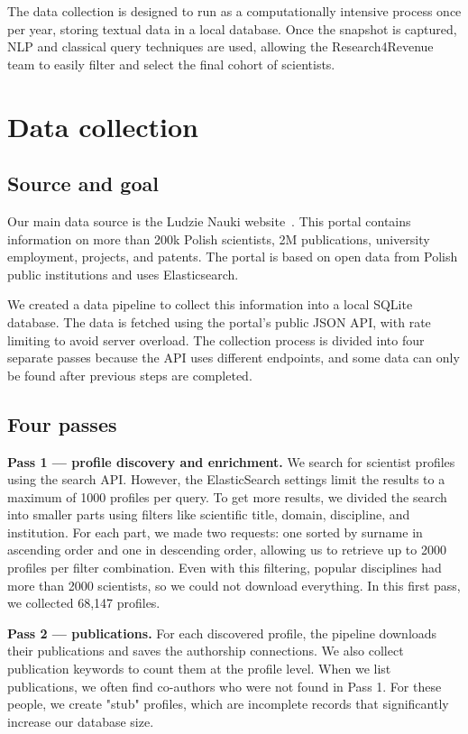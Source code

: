 \documentclass{article}
\begin{document}
The data collection is designed to run as a computationally intensive process once per year, storing textual data in a local database. Once the snapshot is captured, NLP and classical query techniques are used, allowing the Research4Revenue team to easily filter and select the final cohort of scientists.

\section{Data collection}

\subsection{Source and goal}
Our main data source is the Ludzie Nauki website~\cite{ludzie-nauki}. This portal contains information on more than 200k Polish scientists, 2M publications, university employment, projects, and patents. The portal is based on open data from Polish public institutions and uses Elasticsearch. 

We created a data pipeline to collect this information into a local SQLite database. The data is fetched using the portal's public JSON API, with rate limiting to avoid server overload. The collection process is divided into four separate passes because the API uses different endpoints, and some data can only be found after previous steps are completed.

\subsection{Four passes}
\textbf{Pass 1 --- profile discovery and enrichment.}
We search for scientist profiles using the search API. However, the ElasticSearch settings limit the results to a maximum of 1000 profiles per query. To get more results, we divided the search into smaller parts using filters like scientific title, domain, discipline, and institution. For each part, we made two requests: one sorted by surname in ascending order and one in descending order, allowing us to retrieve up to 2000 profiles per filter combination. Even with this filtering, popular disciplines had more than 2000 scientists, so we could not download everything. In this first pass, we collected 68,147 profiles.

\textbf{Pass 2 --- publications.}
For each discovered profile, the pipeline downloads their publications and saves the authorship connections. We also collect publication keywords to count them at the profile level. When we list publications, we often find co-authors who were not found in Pass 1. For these people, we create "stub" profiles, which are incomplete records that significantly increase our database size.
\end{document}
